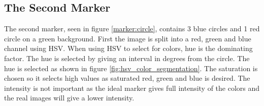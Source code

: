\subsection{The Second Marker}
The second marker, seen in figure \ref{marker:circle}, contains 3 blue circles and 1 red circle on a green background.
First the image is split into a red, green and blue channel using HSV.
When using HSV to select for colors, hue is the dominating factor.
The hue is selected by giving an interval in degrees from the circle.
The hue is selected as shown in figure \ref{fig:hsv_color_segmentation}.
The saturation is chosen so it selects high values as saturated red, green and blue is desired.
The intensity is not important as the ideal marker gives full intensity of the colors and the real images will give a lower intensity.

\begin{figure}
\centering
\def\scalingFactor{0.4}
%
%
\end{figure}
